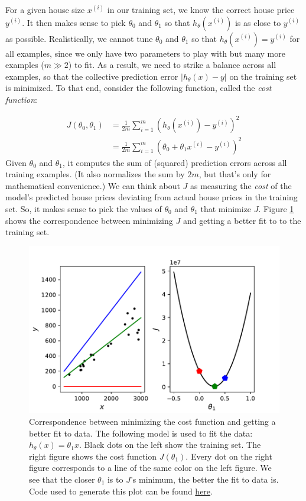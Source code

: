 \documentclass{article}
\theoremstyle{definition}
\begin{document}
For a given house size $x^{(i)}$ in our training set, we know the correct house price $y^{(i)}$. It then makes sense to pick $\theta_0$ and $\theta_1$ so that $h_{\theta}(x^{(i)})$ is as close to $y^{(i)}$ as possible. Realistically, we cannot tune $\theta_0$ and $\theta_1$ so that $h_{\theta}(x^{(i)})=y^{(i)}$ for all examples, since we only have two parameters to play with but many more examples ($m \gg 2$) to fit. As a result, we need to strike a balance across all examples, so that the collective prediction error $|h_{\theta}(x) - y|$ on the training set is minimized. To that end, consider the following function, called the \textit{cost function}:

\begin{align}
    J(\theta_0, \theta_1) &= \frac{1}{2m}\sum_{i=1}^{m}(h_{\theta}(x^{(i)}) - y^{(i)})^2
    \label{linreg-eq:costfunc}\\
    &= \frac{1}{2m}\sum_{i=1}^{m}(\theta_0 + \theta_1 x^{(i)} - y^{(i)})^2
    \label{linreg-eq:univar-costfunc}
\end{align}
Given $\theta_0$ and $\theta_1$, it computes the sum of (squared) prediction errors across all training examples. (It also normalizes the sum by $2m$, but that's only for mathematical convenience.) We can think about $J$ as measuring the \textit{cost} of the model's predicted house prices deviating from actual house prices in the training set. So, it makes sense to pick the values of $\theta_0$ and $\theta_1$ that minimize $J$. Figure \ref{linreg-fig:costfunc} shows the correspondence between minimizing $J$ and getting a better fit to to the training set. 

\begin{figure}[ht]
\centering
\includegraphics[scale=0.7]{images/lin_reg/costfunc.pdf}
\caption{Correspondence between minimizing the cost function and getting a better fit to data. The following model is used to fit the data: $h_{\theta}(x) = \theta_1 x$. Black dots on the left show the training set. The right figure shows the cost function $J(\theta_1)$. Every dot on the right figure corresponds to a line of the same color on the left figure. We see that the closer $\theta_1$ is to $J$'s minimum, the better the fit to data is. Code used to generate this plot can be found \href{https://github.com/siavashaslanbeigi/ml_notes_supp/blob/master/lin_reg/costfunction.ipynb}{here}.}
\label{linreg-fig:costfunc}
\end{figure}
\end{document}

